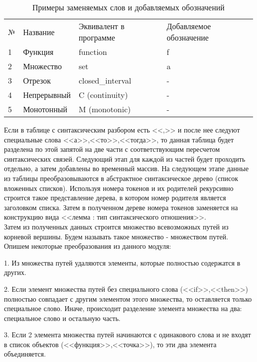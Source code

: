 \documentclass[12pt]{article}
\begin{document}
\begin{table}[h!]
\begin{tabular}{ l l l l}
№ & Название & Эквивалент в программе & Добавляемое обозначение \\
1 & Функция & function & f \\
2 & Множество & set & a \\
3 & Отрезок & closed\_interval & - \\
4 & Непрерывный & C (continuity) & - \\
5 & Монотонный & M (monotonic) & - \\

\end{tabular}
\label{table:satellites}
  \caption{Примеры заменяемых слов и добавляемых обозначений}
\end{table} 

Если в таблице с синтаксическим разбором  есть <<,>>  и после нее следуют специальные слова <<а>>,<<то>>,<<тогда>>, то данная таблица будет разделена по этой запятой на две части с соответствующим пересчетом синтаксических связей. Следующий этап для каждой из частей будет проходить отдельно, а затем добавлены во временный массив. На следующем этапе данные из таблицы преобразовываются в абстрактное синтаксическое дерево (список вложенных списков). Используя  номера токенов и их родителей рекурсивно строится такое представление дерева, в котором номер родителя является заголовком списка. Затем в полученном дереве номера токенов заменяется на конструкцию вида <<лемма : тип синтаксического отношения>>.\\

Затем из полученных данных строится множество всевозможных путей из корневой вершины. Будем называть такое множество - множеством путей. \\

Опишем некоторые преобразования из данного модуля: 

1. Из множества путей удаляются элементы, которые полностью содержатся в других. 

2. Если элемент множества путей без специального слова (<<if>>,<<then>>) полностью совпадает с другим элементом этого множества, то оставляется только специальное слово. Иначе, происходит разделение элемента множества на два: специальное слово и остальную часть. 

3. Если 2 элемента множества путей начинаются с одинакового слова и не входят в список объектов (<<функция>>,<<точка>>), то эти два элемента объединяется. 
\end{document}
